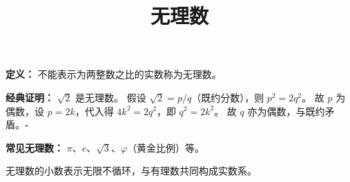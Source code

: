 \documentclass{article}
\begin{document}
\title{无理数}
\author{}
\date{}
\maketitle

\textbf{定义：} 不能表示为两整数之比的实数称为无理数。

\textbf{经典证明：} $\sqrt{2}$ 是无理数。
假设 $\sqrt{2}=p/q$（既约分数），则 $p^2=2q^2$。
故 $p$ 为偶数，设 $p=2k$，代入得 $4k^2=2q^2$，即 $q^2=2k^2$。
故 $q$ 亦为偶数，与既约矛盾。$\square$

\textbf{常见无理数：} $\pi$、$e$、$\sqrt{3}$、$\varphi$（黄金比例）等。

无理数的小数表示无限不循环，与有理数共同构成实数系。
\end{document}
